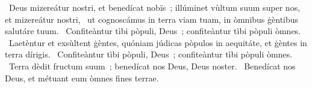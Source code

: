 \psalmChapterWithInscription{}
{ }
{%
~Deus mizereátur nostri, et benedícat nobïs~; illúminet vùltum suum super nos, et mizereátur nostri, 
~ut cognoscámus in terra viam tuam, in òmnibus ġèntibus salutáre tuum. 
~Confiteàntur tìbi pòpuli, Deus~; confiteàntur tìbi pòpuli òmnes. 
~Laetèntur et exsùltent ġèntes, quóniam júdicas pòpulos in aequitáte, et ġèntes in terra dírigis. 
~Confiteàntur tìbi pòpuli, Deus~; confiteàntur tìbi pòpuli òmnes. 
~Terra dèdit fructum suum~; benedícat nos Deus, Deus noster. 
~Benedícat nos Deus, et métuant eum òmnes fines terrae. 
}
